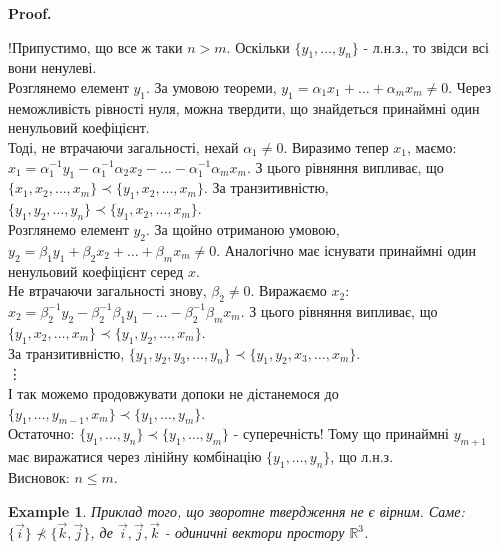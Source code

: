 \documentclass[a4paper, 10pt]{article}
\makeatletter
\theoremstyle{theoremdd}
\newtheorem{example}[theorem]{Example}
\renewenvironment{proof}[1][Proof.\\]{\par
\pushQED{\hfill \qed}%
\normalfont \topsep6\p@\@plus6\p@\relax
\trivlist
\item\relax
{\bfseries
#1\@addpunct{.}}\hspace\labelsep\ignorespaces
}{%
\popQED\endtrivlist\@endpefalse
}
\makeatother
\begin{document}
	\begin{proof}
	!Припустимо, що все ж таки $n > m$. Оскільки $\{y_1,\dots,y_n\}$ - л.н.з., то звідси всі вони ненулеві.\\
Розглянемо елемент $y_1$. За умовою теореми, $y_1 = \alpha_1 x_1 + \dots + \alpha_m x_m \neq 0$. Через неможливість рівності нуля, можна твердити, що знайдеться принаймні один ненульовий коефіцієнт.\\
Тоді, не втрачаючи загальності, нехай $\alpha_1 \neq 0$. Виразимо тепер $x_1$, маємо:\\
$x_1 = \alpha_1^{-1}y_1 - \alpha_1^{-1}\alpha_2 x_2 - \dots - \alpha_1^{-1} \alpha_m x_m$. З цього рівняння випливає, що $\{x_1, x_2, \dots,x_m\} \prec \{y_1, x_2, \dots,x_m\}$. За транзитивністю, $\{y_1,y_2,\dots,y_n \} \prec \{y_1,x_2,\dots,x_m \}$.\\
Розглянемо елемент $y_2$. За щойно отриманою умовою, $y_2 = \beta_1 y_1 + \beta_2 x_2 + \dots + \beta_m x_m \neq 0$. Аналогічно має існувати принаймні один ненульовий коефіцієнт серед $x$. \\
Не втрачаючи загальності знову, $\beta_2 \neq 0$. Виражаємо $x_2$:\\
$x_2 = \beta_2^{-1}y_2 - \beta_2^{-1}\beta_1 y_1 - \dots - \beta_2^{-1} \beta_m x_m$. З цього рівняння випливає, що $\{y_1,x_2,\dots,x_m\} \prec \{y_1,y_2,\dots,x_m\}$.\\
За транзитивністю, $\{y_1,y_2,y_3,\dots,y_n\} \prec \{y_1,y_2,x_3,\dots,x_m\}$.\\
\vdots \\
І так можемо продовжувати допоки не дістанемося до $\{y_1,\dots, y_{m-1}, x_m\} \prec \{y_1,\dots,y_m\}$.\\
Остаточно: $\{y_1,\dots,y_n\} \prec \{y_1,\dots,y_m\}$ - суперечність! Тому що принаймні $y_{m+1}$ має виражатися через лінійну комбінацію $\{y_1,\dots,y_n\}$, що л.н.з.\\
Висновок: $n \leq m$.
	\end{proof}
	
	\begin{example}
	Приклад того, що зворотне твердження не є вірним. Саме:\\ 
	$\{\vec{i}\} \not\prec \{\vec{k}, \vec{j}\}$, де $\vec{i},\vec{j},\vec{k}$ - одиничні вектори простору $\mathbb{R}^3$.
	\end{example}
	
\end{document}
